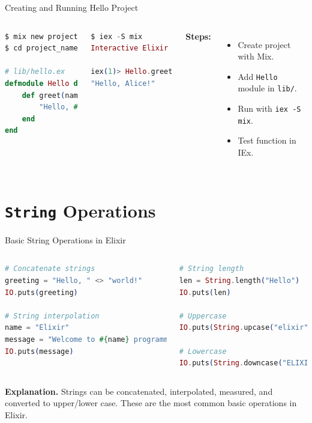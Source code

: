 \documentclass[aspectratio=169, table]{beamer}
\begin{document}
\begin{frame}[fragile]{Creating and Running Hello Project}
\begin{columns}[t]
\begin{lstlisting}[language=Elixir]
$ mix new project_name
$ cd project_name

# lib/hello.ex
defmodule Hello do
	def greet(name) do
		"Hello, #{name}!"
	end
end
\end{lstlisting}

\begin{lstlisting}[language=Elixir]
$ iex -S mix
Interactive Elixir (1.16.0)

iex(1)> Hello.greet("Alice")
"Hello, Alice!"
\end{lstlisting}

\textbf{Steps:}
\begin{itemize}
\item Create project with Mix.
\item Add \texttt{Hello} module in \texttt{lib/}.
\item Run with \texttt{iex -S mix}.
\item Test function in IEx.
\end{itemize}
\end{columns}
\end{frame}

\section{\texttt{String} Operations}

\begin{frame}[fragile]{Basic String Operations in Elixir}
\begin{columns}[t]
\begin{lstlisting}[language=Elixir]
# Concatenate strings
greeting = "Hello, " <> "world!"
IO.puts(greeting)

# String interpolation
name = "Elixir"
message = "Welcome to #{name} programming!"
IO.puts(message)
\end{lstlisting}

\begin{lstlisting}[language=Elixir]
# String length
len = String.length("Hello")
IO.puts(len)

# Uppercase
IO.puts(String.upcase("elixir"))

# Lowercase
IO.puts(String.downcase("ELIXIR"))
\end{lstlisting}

\vspace{8pt}

\end{columns}
\textbf{Explanation.}  
Strings can be concatenated, interpolated,  
measured, and converted to upper/lower case.  
These are the most common basic operations in Elixir.
\end{frame}
\end{document}

